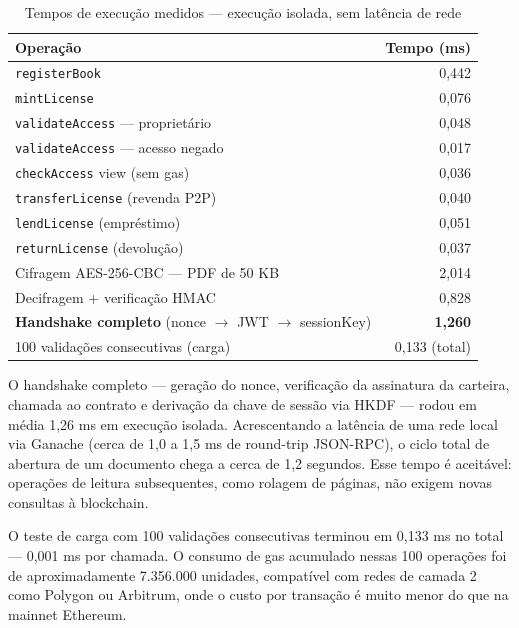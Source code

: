\documentclass[12pt]{article}
\begin{document}
\begin{table}[H]
\centering
\caption{Tempos de execução medidos --- execução isolada, sem latência de rede}
\label{tab:tempos}
\begin{tabular}{|l|r|}
\hline
\textbf{Operação}                                      & \textbf{Tempo (ms)} \\
\hline
\texttt{registerBook}                                  & 0,442 \\
\hline
\texttt{mintLicense}                                   & 0,076 \\
\hline
\texttt{validateAccess} --- proprietário               & 0,048 \\
\hline
\texttt{validateAccess} --- acesso negado              & 0,017 \\
\hline
\texttt{checkAccess} view (sem gas)                    & 0,036 \\
\hline
\texttt{transferLicense} (revenda P2P)                 & 0,040 \\
\hline
\texttt{lendLicense} (empréstimo)                      & 0,051 \\
\hline
\texttt{returnLicense} (devolução)                     & 0,037 \\
\hline
Cifragem AES-256-CBC --- PDF de 50 KB                  & 2,014 \\
\hline
Decifragem + verificação HMAC                          & 0,828 \\
\hline
\textbf{Handshake completo} (nonce $\to$ JWT $\to$ sessionKey) & \textbf{1,260} \\
\hline
100 validações consecutivas (carga)                    & 0,133 (total) \\
\hline
\end{tabular}
\end{table}

O handshake completo — geração do nonce, verificação da assinatura da carteira, chamada ao contrato e derivação da chave de sessão via HKDF — rodou em média 1,26 ms em execução isolada. Acrescentando a latência de uma rede local via Ganache (cerca de 1,0 a 1,5 ms de round-trip JSON-RPC), o ciclo total de abertura de um documento chega a cerca de 1,2 segundos. Esse tempo é aceitável: operações de leitura subsequentes, como rolagem de páginas, não exigem novas consultas à blockchain.

O teste de carga com 100 validações consecutivas terminou em 0,133 ms no total — 0,001 ms por chamada. O consumo de gas acumulado nessas 100 operações foi de aproximadamente 7.356.000 unidades, compatível com redes de camada 2 como Polygon ou Arbitrum, onde o custo por transação é muito menor do que na mainnet Ethereum.
\end{document}

